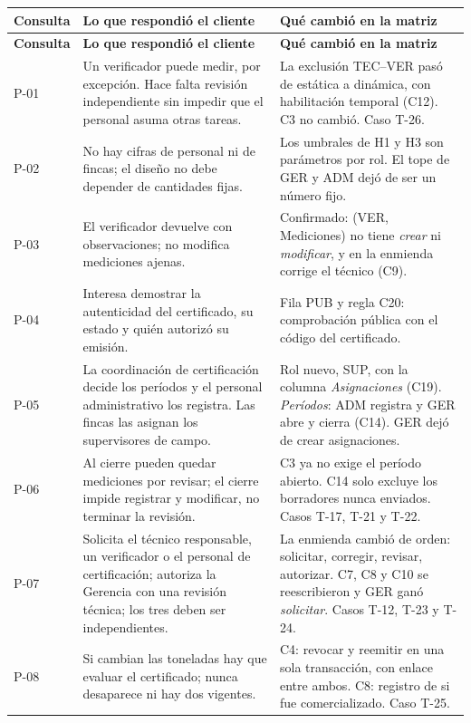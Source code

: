 \documentclass[11pt,letterpaper]{article}
\newcommand{\cab}[1]{\textbf{\rmfamily #1}}
\begin{document}
{\small
\renewcommand{\arraystretch}{1.22}
\begin{longtable}{@{}L{1.2cm} L{6.0cm} L{8.4cm}@{}}
\toprule
\cab{Consulta} & \cab{Lo que respondió el cliente} & \cab{Qué cambió en la matriz} \\
\midrule
\endfirsthead
\toprule
\cab{Consulta} & \cab{Lo que respondió el cliente} & \cab{Qué cambió en la matriz} \\
\midrule
\endhead
\bottomrule
\endfoot
P-01 & Un verificador puede medir, por excepción. Hace falta revisión independiente sin impedir que el personal asuma otras tareas. & La exclusión TEC--VER pasó de estática a dinámica, con habilitación temporal (C12). C3 no cambió. Caso T-26. \\
P-02 & No hay cifras de personal ni de fincas; el diseño no debe depender de cantidades fijas. & Los umbrales de H1 y H3 son parámetros por rol. El tope de GER y ADM dejó de ser un número fijo. \\
P-03 & El verificador devuelve con observaciones; no modifica mediciones ajenas. & Confirmado: (VER, Mediciones) no tiene \emph{crear} ni \emph{modificar}, y en la enmienda corrige el técnico (C9). \\
P-04 & Interesa demostrar la autenticidad del certificado, su estado y quién autorizó su emisión. & Fila PUB y regla C20: comprobación pública con el código del certificado. \\
P-05 & La coordinación de certificación decide los períodos y el personal administrativo los registra. Las fincas las asignan los supervisores de campo. & Rol nuevo, SUP, con la columna \emph{Asignaciones} (C19). \emph{Períodos}: ADM registra y GER abre y cierra (C14). GER dejó de crear asignaciones. \\
P-06 & Al cierre pueden quedar mediciones por revisar; el cierre impide registrar y modificar, no terminar la revisión. & C3 ya no exige el período abierto. C14 solo excluye los borradores nunca enviados. Casos T-17, T-21 y T-22. \\
P-07 & Solicita el técnico responsable, un verificador o el personal de certificación; autoriza la Gerencia con una revisión técnica; los tres deben ser independientes. & La enmienda cambió de orden: solicitar, corregir, revisar, autorizar. C7, C8 y C10 se reescribieron y GER ganó \emph{solicitar}. Casos T-12, T-23 y T-24. \\
P-08 & Si cambian las toneladas hay que evaluar el certificado; nunca desaparece ni hay dos vigentes. & C4: revocar y reemitir en una sola transacción, con enlace entre ambos. C8: registro de si fue comercializado. Caso T-25. \\

\end{longtable}}
\end{document}
